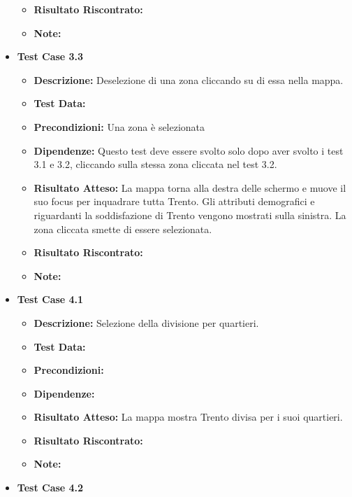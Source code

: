 \begin{itemize}
\begin{itemize}
                    \item \textbf{Risultato Riscontrato:}
                    \item \textbf{Note:}
                \end{itemize}
            \item \textbf{Test Case 3.3}
                \begin{itemize}
                    \item \textbf{Descrizione:} Deselezione di una zona cliccando su di essa nella mappa.
                    \item \textbf{Test Data:}
                    \item \textbf{Precondizioni:} Una zona è selezionata
                    \item \textbf{Dipendenze:} Questo test deve essere svolto solo dopo aver svolto i test 3.1 e 3.2, cliccando sulla stessa zona cliccata nel test 3.2.
                    \item \textbf{Risultato Atteso:} La mappa torna alla destra delle schermo e muove il suo focus per inquadrare tutta Trento. Gli attributi demografici e riguardanti la soddisfazione di Trento vengono mostrati sulla sinistra. La zona cliccata smette di essere selezionata.
                    \item \textbf{Risultato Riscontrato:}
                    \item \textbf{Note:}
                \end{itemize}  
            \item \textbf{Test Case 4.1}
                \begin{itemize}
                    \item \textbf{Descrizione:} Selezione della divisione per quartieri.
                    \item \textbf{Test Data:}
                    \item \textbf{Precondizioni:} 
                    \item \textbf{Dipendenze:}
                    \item \textbf{Risultato Atteso:} La mappa mostra Trento divisa per i suoi quartieri.
                    \item \textbf{Risultato Riscontrato:}
                    \item \textbf{Note:}
                \end{itemize}
            \item \textbf{Test Case 4.2}
                \begin{itemize}

\end{itemize}
\end{itemize}
